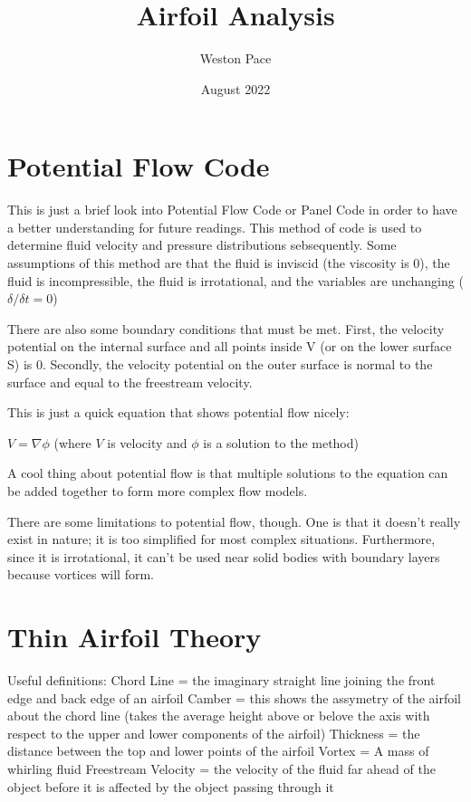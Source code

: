 \documentclass[12pt, letterpaper]{article}
\title{Airfoil Analysis}
\author{Weston Pace}
\date{August 2022}
\begin{document}
\maketitle

\section{Potential Flow Code}

This is just a brief look into Potential Flow Code or Panel Code in order to have a better understanding for future readings. 
This method of code is used to determine fluid velocity and pressure distributions sebsequently. Some assumptions of this method are that the fluid is 
inviscid (the viscosity is 0), the fluid is incompressible, the fluid is irrotational, and the variables are unchanging ($\delta/\delta t = 0$)

There are also some boundary conditions that must be met. First, the velocity potential on the internal surface and all points inside V (or on the lower
surface S) is 0. Secondly, the velocity potential on the outer surface is normal to the surface and equal to the freestream velocity.

This is just a quick equation that shows potential flow nicely:

$V = \nabla \phi$ (where $V$ is velocity and $\phi$ is a solution to the method)

A cool thing about potential flow is that multiple solutions to the equation can be added together to form more complex flow models.

There are some limitations to potential flow, though. One is that it doesn't really exist in nature; it is too simplified for most complex situations.
Furthermore, since it is irrotational, it can't be used near solid bodies with boundary layers because vortices will form. 

\section{Thin Airfoil Theory}
Useful definitions:
Chord Line = the imaginary straight line joining the front edge and back edge of an airfoil
Camber = this shows the assymetry of the airfoil about the chord line (takes the average height above or belove the axis with respect to the upper
         and lower components of the airfoil)
Thickness = the distance between the top and lower points of the airfoil
Vortex = A mass of whirling fluid
Freestream Velocity = the velocity of the fluid far ahead of the object before it is affected by the object passing through it
\end{document}
